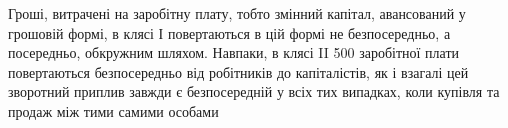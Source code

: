 Гроші, витрачені на заробітну плату, тобто змінний капітал, авансований
у грошовій формі, в клясі І повертаються в цій формі не безпосередньо,
а посередньо, обкружним шляхом. Навпаки, в клясі II 500 заробітної плати повертаються безпосередньо від робітників до
капіталістів, як і взагалі цей зворотний приплив завжди є безпосередній
у всіх тих випадках, коли купівля та продаж між тими самими особами
\parbreak{}  %
